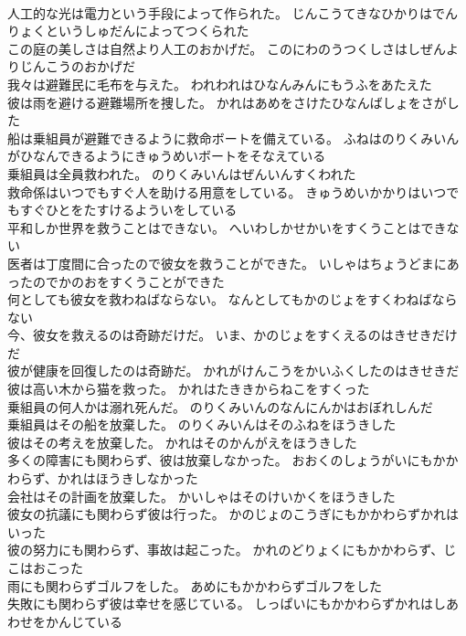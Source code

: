 \documentclass[8pt]{extreport}
\begin{document}
\begin{CJK}{UTF8}{min}
\\	人工的な光は電力という手段によって作られた。	じんこうてきなひかりはでんりょくというしゅだんによってつくられた 
\\	この庭の美しさは自然より人工のおかげだ。	このにわのうつくしさはしぜんよりじんこうのおかげだ 
\\	我々は避難民に毛布を与えた。	われわれはひなんみんにもうふをあたえた 
\\	彼は雨を避ける避難場所を捜した。	かれはあめをさけたひなんばしょをさがした 
\\	船は乗組員が避難できるように救命ボートを備えている。	ふねはのりくみいんがひなんできるようにきゅうめいボートをそなえている 
\\	乗組員は全員救われた。	のりくみいんはぜんいんすくわれた 
\\	救命係はいつでもすぐ人を助ける用意をしている。	きゅうめいかかりはいつでもすぐひとをたすけるよういをしている 
\\	平和しか世界を救うことはできない。	へいわしかせかいをすくうことはできない 
\\	医者は丁度間に合ったので彼女を救うことができた。	いしゃはちょうどまにあったのでかのおをすくうことができた 
\\	何としても彼女を救わねばならない。	なんとしてもかのじょをすくわねばならない 
\\	今、彼女を救えるのは奇跡だけだ。	いま、かのじょをすくえるのはきせきだけだ 
\\	彼が健康を回復したのは奇跡だ。	かれがけんこうをかいふくしたのはきせきだ 
\\	彼は高い木から猫を救った。	かれはたききからねこをすくった 
\\	乗組員の何人かは溺れ死んだ。	のりくみいんのなんにんかはおぼれしんだ 
\\	乗組員はその船を放棄した。	のりくみいんはそのふねをほうきした 
\\	彼はその考えを放棄した。	かれはそのかんがえをほうきした 
\\	多くの障害にも関わらず、彼は放棄しなかった。	おおくのしょうがいにもかかわらず、かれはほうきしなかった 
\\	会社はその計画を放棄した。	かいしゃはそのけいかくをほうきした 
\\	彼女の抗議にも関わらず彼は行った。	かのじょのこうぎにもかかわらずかれはいった 
\\	彼の努力にも関わらず、事故は起こった。	かれのどりょくにもかかわらず、じこはおこった 
\\	雨にも関わらずゴルフをした。	あめにもかかわらずゴルフをした 
\\	失敗にも関わらず彼は幸せを感じている。	しっぱいにもかかわらずかれはしあわせをかんじている 

\end{CJK}
\end{document}
